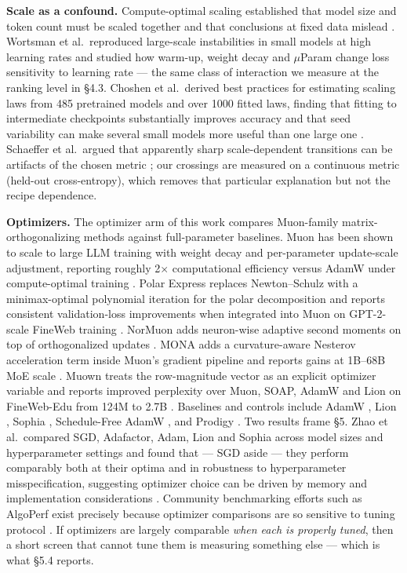 \textbf{Scale as a confound.} Compute-optimal scaling established that model size and token count must
be scaled together and that conclusions at fixed data mislead \cite{ref9,ref10}. Wortsman et al.~reproduced
large-scale instabilities in small models at high learning rates and studied how warm-up, weight
decay and $\mu$Param change loss sensitivity to learning rate \cite{ref11} --- the same class of interaction we
measure at the ranking level in \S4.3. Choshen et al.~derived best practices for estimating scaling
laws from 485 pretrained models and over 1000 fitted laws, finding that fitting to intermediate
checkpoints substantially improves accuracy and that seed variability can make several small
models more useful than one large one \cite{ref37}. Schaeffer et al.~argued that apparently sharp
scale-dependent transitions can be artifacts of the chosen metric \cite{ref13}; our crossings are measured
on a continuous metric (held-out cross-entropy), which removes that particular explanation but not
the recipe dependence.

\textbf{Optimizers.} The optimizer arm of this work compares Muon-family matrix-orthogonalizing
methods against full-parameter baselines. Muon has been shown to scale to large LLM training with
weight decay and per-parameter update-scale adjustment, reporting roughly 2$\times$ computational
efficiency versus AdamW under compute-optimal training \cite{ref14}. Polar Express replaces Newton--Schulz
with a minimax-optimal polynomial iteration for the polar decomposition and reports consistent
validation-loss improvements when integrated into Muon on GPT-2-scale FineWeb training \cite{ref15}.
NorMuon adds neuron-wise adaptive second moments on top of orthogonalized updates \cite{ref16}. MONA adds
a curvature-aware Nesterov acceleration term inside Muon's gradient pipeline and reports gains at
1B--68B MoE scale \cite{ref17}. Muown treats the row-magnitude vector as an explicit optimizer variable and
reports improved perplexity over Muon, SOAP, AdamW and Lion on FineWeb-Edu from 124M to 2.7B \cite{ref18}.
Baselines and controls include AdamW \cite{ref19}, Lion \cite{ref20}, Sophia \cite{ref21}, Schedule-Free AdamW \cite{ref22}, and
Prodigy \cite{ref23}. Two results frame \S5. Zhao et al.~compared SGD, Adafactor, Adam, Lion and Sophia
across model sizes and hyperparameter settings and found that --- SGD aside --- they perform
comparably both at their optima and in robustness to hyperparameter misspecification, suggesting
optimizer choice can be driven by memory and implementation considerations \cite{ref36}. Community
benchmarking efforts such as AlgoPerf exist precisely because optimizer comparisons are so
sensitive to tuning protocol \cite{ref24}. If optimizers are largely comparable \emph{when each is properly
tuned}, then a short screen that cannot tune them is measuring something else --- which is what \S5.4
reports.

